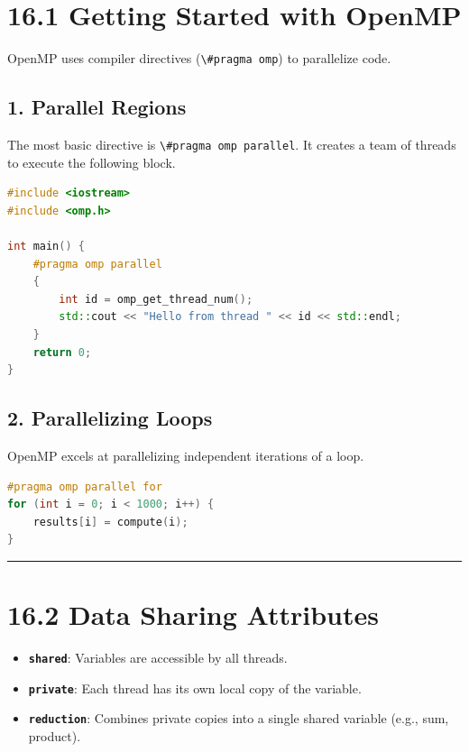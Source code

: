 \hypertarget{getting-started-with-openmp}{%
\section{16.1 Getting Started with
OpenMP}\label{getting-started-with-openmp}}

OpenMP uses compiler directives (\passthrough{\lstinline!\#pragma omp!})
to parallelize code.

\hypertarget{parallel-regions}{%
\subsection{1. Parallel Regions}\label{parallel-regions}}

The most basic directive is
\passthrough{\lstinline!\#pragma omp parallel!}. It creates a team of
threads to execute the following block.

\begin{lstlisting}[language={C++}]
#include <iostream>
#include <omp.h>

int main() {
    #pragma omp parallel
    {
        int id = omp_get_thread_num();
        std::cout << "Hello from thread " << id << std::endl;
    }
    return 0;
}
\end{lstlisting}

\hypertarget{parallelizing-loops}{%
\subsection{2. Parallelizing Loops}\label{parallelizing-loops}}

OpenMP excels at parallelizing independent iterations of a loop.

\begin{lstlisting}[language={C++}]
#pragma omp parallel for
for (int i = 0; i < 1000; i++) {
    results[i] = compute(i);
}
\end{lstlisting}

\begin{center}\rule{0.5\linewidth}{0.5pt}\end{center}

\hypertarget{data-sharing-attributes}{%
\section{16.2 Data Sharing Attributes}\label{data-sharing-attributes}}

\begin{itemize}
\tightlist
\item
  \textbf{\passthrough{\lstinline!shared!}}: Variables are accessible by
  all threads.
\item
  \textbf{\passthrough{\lstinline!private!}}: Each thread has its own
  local copy of the variable.
\item
  \textbf{\passthrough{\lstinline!reduction!}}: Combines private copies
  into a single shared variable (e.g., sum, product).
\end{itemize}


